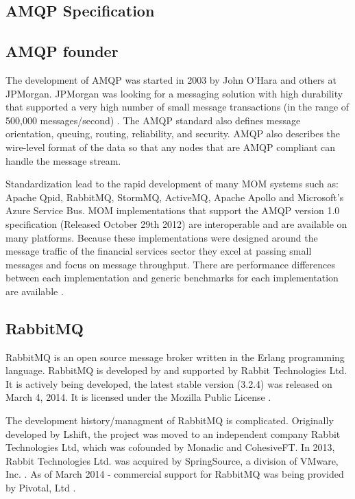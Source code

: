 \documentclass{thesis}
\begin{document}
\subsection{AMQP Specification}

\subsection{AMQP founder}
The development of AMQP was started in 2003 by John O'Hara and others at JPMorgan.  JPMorgan was looking for a messaging solution with high durability that supported a very high number of small message transactions (in the range of 500,000 messages/second) \cite{todo}.  The AMQP standard also defines message orientation, queuing, routing, reliability, and security.   AMQP also describes the wire-level format of the data so that any nodes that are AMQP compliant can handle the message stream.  

Standardization lead to the rapid development of many MOM systems such as: Apache Qpid, RabbitMQ, StormMQ, ActiveMQ, Apache Apollo and Microsoft’s Azure Service Bus.  MOM implementations that support the AMQP version 1.0 specification (Released October 29th 2012) \cite{todo} are interoperable and are available on many platforms.  Because these implementations were designed around the message traffic of the financial services sector they excel at passing small messages and focus on message throughput.  There are performance differences between each implementation and generic benchmarks for each implementation are available \cite{todo}\cite{todo}.

\subsection{RabbitMQ}
RabbitMQ is an open source message broker written in the Erlang programming language.   RabbitMQ is developed by and supported by Rabbit Technologies Ltd.  It is actively being developed, the latest stable version (3.2.4) was released on March 4, 2014.  It is licensed under the Mozilla Public License \cite{rabbitmq-wikipedia}.

The development history/managment of RabbitMQ is complicated.  Originally developed by Lshift, the project was moved to an independent company Rabbit Technologies Ltd, which was cofounded by Monadic and CohesiveFT.  In 2013, Rabbit Technologies Ltd. was acquired by SpringSource, a division of VMware, Inc. .  As of March 2014 - commercial support for RabbitMQ was being provided by Pivotal, Ltd  .
\end{document}

